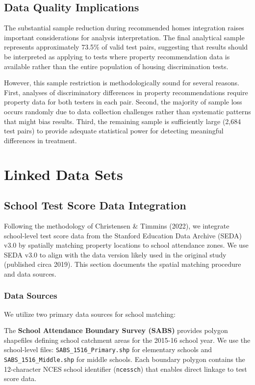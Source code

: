\documentclass{article}
\begin{document}
\subsection{Data Quality Implications}

The substantial sample reduction during recommended homes integration raises important considerations for analysis interpretation. The final analytical sample represents approximately 73.5\% of valid test pairs, suggesting that results should be interpreted as applying to tests where property recommendation data is available rather than the entire population of housing discrimination tests.

However, this sample restriction is methodologically sound for several reasons. First, analyses of discriminatory differences in property recommendations require property data for both testers in each pair. Second, the majority of sample loss occurs randomly due to data collection challenges rather than systematic patterns that might bias results. Third, the remaining sample is sufficiently large (2,684 test pairs) to provide adequate statistical power for detecting meaningful differences in treatment.


\section{Linked Data Sets}

\subsection{School Test Score Data Integration}

Following the methodology of Christensen \& Timmins (2022), we integrate school-level test score data from the Stanford Education Data Archive (SEDA) v3.0 by spatially matching property locations to school attendance zones. We use SEDA v3.0 to align with the data version likely used in the original study (published circa 2019). This section documents the spatial matching procedure and data sources.

\subsubsection{Data Sources}

We utilize two primary data sources for school matching:

The \textbf{School Attendance Boundary Survey (SABS)} provides polygon shapefiles defining school catchment areas for the 2015-16 school year. We use the school-level files: \texttt{SABS\_1516\_Primary.shp} for elementary schools and \texttt{SABS\_1516\_Middle.shp} for middle schools. Each boundary polygon contains the 12-character NCES school identifier (\texttt{ncessch}) that enables direct linkage to test score data.
\end{document}
